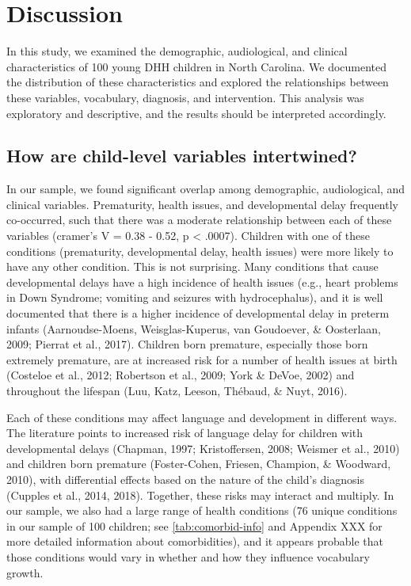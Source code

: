 \documentclass[english,man]{apa6}
\begin{document}
\hypertarget{discussion}{%
\section{Discussion}\label{discussion}}

In this study, we examined the demographic, audiological, and clinical characteristics of 100 young DHH children in North Carolina. We documented the distribution of these characteristics and explored the relationships between these variables, vocabulary, diagnosis, and intervention. This analysis was exploratory and descriptive, and the results should be interpreted accordingly.

\hypertarget{how-are-child-level-variables-intertwined}{%
\subsection{How are child-level variables intertwined?}\label{how-are-child-level-variables-intertwined}}

In our sample, we found significant overlap among demographic, audiological, and clinical variables. Prematurity, health issues, and developmental delay frequently co-occurred, such that there was a moderate relationship between each of these variables (cramer's V = 0.38 - 0.52, p \textless{} .0007). Children with one of these conditions (prematurity, developmental delay, health issues) were more likely to have any other condition. This is not surprising. Many conditions that cause developmental delays have a high incidence of health issues (e.g., heart problems in Down Syndrome; vomiting and seizures with hydrocephalus), and it is well documented that there is a higher incidence of developmental delay in preterm infants (Aarnoudse-Moens, Weisglas-Kuperus, van Goudoever, \& Oosterlaan, 2009; Pierrat et al., 2017). Children born premature, especially those born extremely premature, are at increased risk for a number of health issues at birth (Costeloe et al., 2012; Robertson et al., 2009; York \& DeVoe, 2002) and throughout the lifespan (Luu, Katz, Leeson, Thébaud, \& Nuyt, 2016).

Each of these conditions may affect language and development in different ways. The literature points to increased risk of language delay for children with developmental delays (Chapman, 1997; Kristoffersen, 2008; Weismer et al., 2010) and children born premature (Foster-Cohen, Friesen, Champion, \& Woodward, 2010), with differential effects based on the nature of the child's diagnosis (Cupples et al., 2014, 2018). Together, these risks may interact and multiply. In our sample, we also had a large range of health conditions (76 unique conditions in our sample of 100 children; see \ref{tab:comorbid-info} and Appendix XXX for more detailed information about comorbidities), and it appears probable that those conditions would vary in whether and how they influence vocabulary growth.
\end{document}
